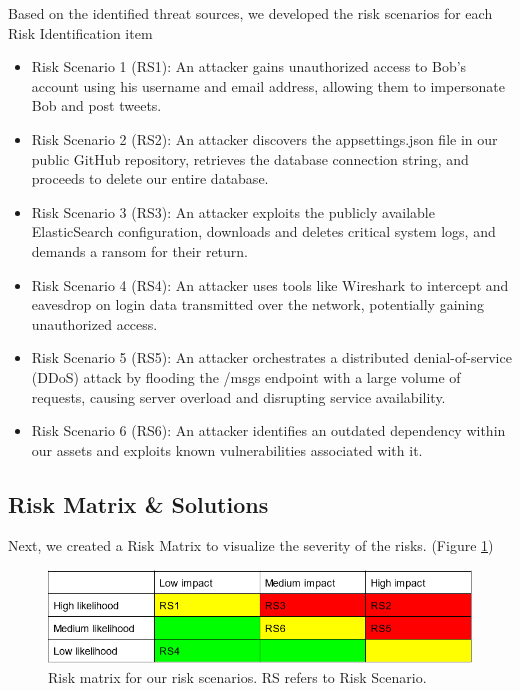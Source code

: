 Based on the identified threat sources, we developed the risk scenarios for each Risk Identification item

\begin{itemize}
\item Risk Scenario 1 (RS1): An attacker gains unauthorized access to Bob's account using his username and email address, allowing them to impersonate Bob and post tweets.
\item Risk Scenario 2 (RS2): An attacker discovers the appsettings.json file in our public GitHub repository, retrieves the database connection string, and proceeds to delete our entire database.
\item Risk Scenario 3 (RS3): An attacker exploits the publicly available ElasticSearch configuration, downloads and deletes critical system logs, and demands a ransom for their return.
\item Risk Scenario 4 (RS4): An attacker uses tools like Wireshark to intercept and eavesdrop on login data transmitted over the network, potentially gaining unauthorized access.
\item Risk Scenario 5 (RS5): An attacker orchestrates a distributed denial-of-service (DDoS) attack by flooding the /msgs endpoint with a large volume of requests, causing server overload and disrupting service availability.
\item Risk Scenario 6 (RS6): An attacker identifies an outdated dependency within our assets and exploits known vulnerabilities associated with it.
\end{itemize}

\subsection{Risk Matrix \& Solutions}

Next, we created a Risk Matrix to visualize the severity of the risks. (Figure \ref{fig:riskmatrix})

\begin{figure}[h]
\centering
\includegraphics[width=1\textwidth]{images/riskmatrix.png}
\caption{Risk matrix for our risk scenarios. RS refers to Risk Scenario.}
\label{fig:riskmatrix}
\end{figure}

